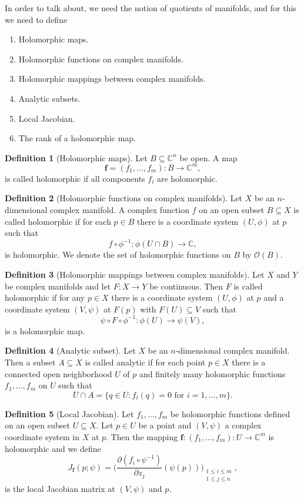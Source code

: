 \documentclass{article}
\theoremstyle{definition}
\newtheorem{defi}{Definition}
\begin{document}
In order to talk about, we need the notion of quotients of manifolds, and for this we need to define
\begin{enumerate}
  \item Holomorphic maps.
  \item Holomorphic functions on complex manifolds.
  \item Holomorphic mappings between complex manifolds.
  \item Analytic subsets.
  \item Local Jacobian.
  \item The rank of a holomorphic map.
\end{enumerate}
\begin{defi}[Holomorphic maps]
  Let $B\subseteq\mathbb{C}^n$ be open. A map
  \[\mathbf{f}=(f_1,\dots,f_m):B\to\mathbb{C}^m,\]
  is called holomorphic if all components $f_i$ are holomorphic.
\end{defi}
\begin{defi}[Holomorphic functions on complex manifolds]
  Let $X$ be an $n$-dimensional complex manifold. A complex function $f$ on an open subset $B\subseteq X$ is called holomorphic if for each $p\in B$ there is a coordinate system $(U,\phi)$ at $p$ such that
  \[f\circ\phi^{-1}:\phi(U\cap B)\to\mathbb{C},\]
  is holomorphic. We denote the set of holomorphic functions on $B$ by $\mathcal{O}(B)$.
\end{defi}
\begin{defi}[Holomorphic mappings between complex manifolds]
  Let $X$ and $Y$ be complex manifolds and let $F:X\to Y$ be continuous. Then $F$ is called holomorphic if for any $p\in X$ there is a coordinate system $(U,\phi)$ at $p$ and a coordinate system $(V,\psi)$ at $F(p)$ with $F(U)\subseteq V$ such that
  \[\psi\circ F\circ\phi^{-1}:\phi(U)\to \psi(V),\]
  is a holomorphic map.
\end{defi}
\begin{defi}[Analytic subset]
  Let $X$ be an $n$-dimensional complex manifold. Then a subset $A\subseteq X$ is called analytic if for each point $p\in X$ there is a connected open neighborhood $U$ of $p$ and finitely many holomorphic functions $f_1,\dots,f_m$ on $U$ such that
  \[U\cap A=\{q\in U:f_i(q)=0\text{ for }i=1,\dots,m\}.\]
\end{defi}
\begin{defi}[Local Jacobian]
  Let $f_1,\dots,f_m$ be holomorphic functions defined on an open subset $U\subseteq X$. Let $p\in U$ be a point and $(V,\psi)$ a complex coordinate system in $X$ at $p$. Then the mapping $\mathbf{f}:(f_1,\dots,f_m):U\to\mathbb{C}^m$ is holomorphic and we define
  \[J_\mathbf{f}(p;\psi)=\Big(\frac{\partial(f_i\circ\psi^{-1})}{\partial z_j}(\psi(p))\Big)_{\substack{1\leq i\leq m\\1\leq j\leq n}},\]
  is the local Jacobian matrix at $(V,\psi)$ and $p$.
\end{defi}
\end{document}
